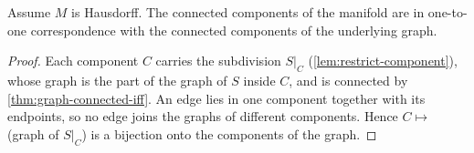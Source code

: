     \begin{corollary}\label{cor:components}

      Assume $M$ is Hausdorff. The connected components of the manifold are in one-to-one
      correspondence with the connected components of the underlying graph.
    \end{corollary}
    \begin{proof}

      Each component $C$ carries the subdivision $S|_C$
      (\cref{lem:restrict-component}), whose graph is the part of the graph of
      $S$ inside $C$, and is connected by \cref{thm:graph-connected-iff}. An
      edge lies in one component together with its endpoints, so no edge joins
      the graphs of different components. Hence $C \mapsto$ (graph of $S|_C$)
      is a bijection onto the components of the graph.
    \end{proof}
